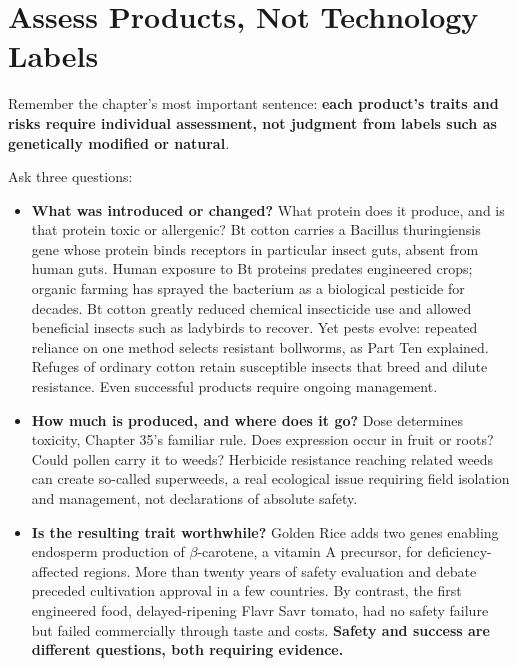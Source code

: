 \section{Assess Products, Not Technology Labels}

Remember the chapter's most important sentence: \textbf{each product's traits and risks require individual assessment, not judgment from labels such as genetically modified or natural}.

Ask three questions:

\begin{itemize}[itemsep=2pt]
\item \textbf{What was introduced or changed?} What protein does it produce, and is that protein toxic or allergenic? Bt cotton carries a Bacillus thuringiensis gene whose protein binds receptors in particular insect guts, absent from human guts. Human exposure to Bt proteins predates engineered crops; organic farming has sprayed the bacterium as a biological pesticide for decades. Bt cotton greatly reduced chemical insecticide use and allowed beneficial insects such as ladybirds to recover. Yet pests evolve: repeated reliance on one method selects resistant bollworms, as Part Ten explained. Refuges of ordinary cotton retain susceptible insects that breed and dilute resistance. Even successful products require ongoing management.
\item \textbf{How much is produced, and where does it go?} Dose determines toxicity, Chapter 35's familiar rule. Does expression occur in fruit or roots? Could pollen carry it to weeds? Herbicide resistance reaching related weeds can create so-called superweeds, a real ecological issue requiring field isolation and management, not declarations of absolute safety.
\item \textbf{Is the resulting trait worthwhile?} Golden Rice adds two genes enabling endosperm production of $\beta$-carotene, a vitamin A precursor, for deficiency-affected regions. More than twenty years of safety evaluation and debate preceded cultivation approval in a few countries. By contrast, the first engineered food, delayed-ripening Flavr Savr tomato, had no safety failure but failed commercially through taste and costs. \textbf{Safety and success are different questions, both requiring evidence.}
\end{itemize}


